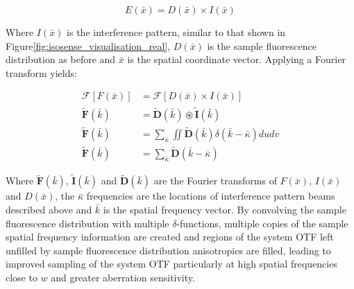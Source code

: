 \begin{equation}\label{eq:isosense_real}
E(\bar{x}) = D(\bar{x}) \times I(\bar{x})
\end{equation}	

Where $I(\bar{x})$ is the interference pattern, similar to that shown in 
Figure\ref{fig:isosense_visualisation_real}, $D(\bar{x})$ is the sample 
fluorescence distribution as before and $\bar{x}$ is the spatial 
coordinate vector. Applying a Fourier transform yields:

\begin{equation}\label{eq:isosense_ft}
\begin{split}
\mathcal{F}[F(\bar{x})] &= \mathcal{F}[D(\bar{x})\times I(\bar{x})] \\
\tilde{\textbf{F}}(\bar{k}) &= \tilde{\textbf{D}}(\bar{k}) \circledast \tilde{\textbf{I}}(\bar{k}) \\
\tilde{\textbf{F}}(\bar{k}) &= \sum_{\bar{\kappa}}\iint\tilde{\textbf{D}}(\bar{k})\delta(\bar{k} - \bar{\kappa})dudv \\
\tilde{\textbf{F}}(\bar{k}) &= \sum_{\bar{\kappa}}\tilde{\textbf{D}}(\bar{k} - \bar{\kappa})
\end{split}
\end{equation}

Where $\tilde{\textbf{F}}(\bar{k})$, $\tilde{\textbf{I}}(\bar{k})$ and 
$\tilde{\textbf{D}}(\bar{k})$ are the Fourier transforms of $F(\bar{x})$, 
$I(\bar{x})$ and $D(\bar{x})$, the $\bar{\kappa}$ frequencies are the 
locations of interference pattern beams described above and $\bar{k}$ is 
the spatial frequency vector. By convolving the sample fluorescence 
distribution with  multiple $\delta$-functions, multiple copies of the 
sample spatial frequency information are created and regions of the 
system OTF left  unfilled by sample fluorescence distribution anisotropies 
are filled, leading to  improved sampling of the system OTF particularly 
at high spatial frequencies close to $w$ and greater aberration 
sensitivity.\cite{vzurauskas2019isosense}

